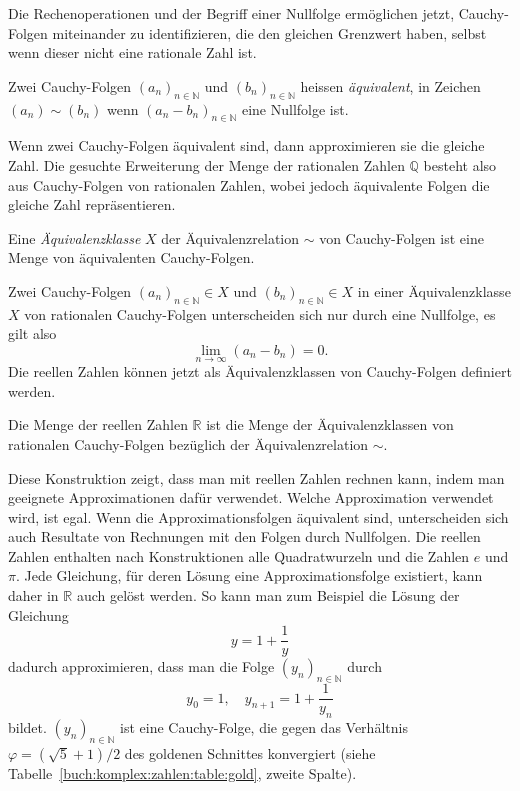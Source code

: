 Die Rechenoperationen und der Begriff einer Nullfolge ermöglichen jetzt,
Cauchy-Folgen miteinander zu identifizieren, die den gleichen Grenzwert
haben, selbst wenn dieser nicht eine rationale Zahl ist.

\begin{definition}
Zwei Cauchy-Folgen
$(a_n)_{n\in\mathbb{N}}$
und
$(b_n)_{n\in\mathbb{N}}$
heissen \emph{äquivalent}, in Zeichen $(a_n)\sim (b_n)$ wenn
$(a_n-b_n)_{n\in\mathbb{N}}$ eine Nullfolge ist.
%
\end{definition}

Wenn zwei Cauchy-Folgen äquivalent sind, dann approximieren sie 
die gleiche Zahl.
Die gesuchte Erweiterung der Menge der rationalen Zahlen $\mathbb{Q}$
besteht also aus Cauchy-Folgen von rationalen Zahlen, wobei jedoch
äquivalente Folgen die gleiche Zahl repräsentieren.

\begin{definition}[Äquivalenzklassen]
%
Eine \emph{Äquivalenzklasse} $X$ der Äquivalenzrelation $\sim$ von
%
Cauchy-Folgen ist eine Menge von äquivalenten Cauchy-Folgen.
\end{definition}

Zwei Cauchy-Folgen
$(a_n)_{n\in\mathbb{N}}\in X$ 
und
$(b_n)_{n\in\mathbb{N}}\in X$ 
in einer Äquivalenzklasse $X$ von rationalen Cauchy-Folgen unterscheiden
sich nur durch eine Nullfolge, es gilt also
\[
\lim_{n\to\infty} (a_n-b_n) = 0.
\]
Die reellen Zahlen können jetzt als Äquivalenzklassen von Cauchy-Folgen
definiert werden.

\begin{definition}
Die Menge der reellen Zahlen $\mathbb{R}$ ist die Menge der Äquivalenzklassen
von rationalen Cauchy-Folgen bezüglich der Äquivalenzrelation $\sim$.
\end{definition}

Diese Konstruktion zeigt, dass man mit reellen Zahlen rechnen kann, indem
man geeignete Approximationen dafür verwendet.
Welche Approximation verwendet wird, ist egal.
Wenn die Approximationsfolgen äquivalent sind, unterscheiden sich auch
Resultate von Rechnungen mit den Folgen durch Nullfolgen.
Die reellen Zahlen enthalten nach Konstruktionen alle Quadratwurzeln
und die Zahlen $e$ und $\pi$.
Jede Gleichung, für deren Lösung eine Approximationsfolge existiert,
kann daher in $\mathbb{R}$ auch gelöst werden.
So kann man zum Beispiel die Lösung der Gleichung
\[
y = 1 + \frac1y
\]
dadurch approximieren, dass man die Folge $(y_n)_{n\in\mathbb{N}}$
durch
\[
y_0 = 1,
\quad
y_{n+1} = 1 + \frac1{y_n}
\]
bildet.
$(y_n)_{n\in\mathbb{N}}$ ist eine Cauchy-Folge, die gegen das Verhältnis
$\varphi=(\!\sqrt{5}+1)/2$ des goldenen Schnittes konvergiert (siehe
Tabelle~\ref{buch:komplex:zahlen:table:gold}, zweite Spalte).


